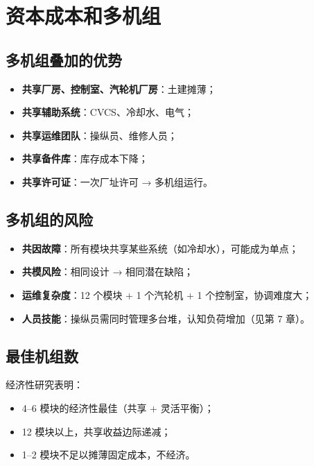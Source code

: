 \documentclass[
  UTF8,
  scheme=plain,
  fontsize=10pt,
  openany
]{ctexbook}
\begin{document}
\section{资本成本和多机组}\label{ux8d44ux672cux6210ux672cux548cux591aux673aux7ec4}

\subsection{多机组叠加的优势}\label{ux591aux673aux7ec4ux53e0ux52a0ux7684ux4f18ux52bf}

\begin{itemize}
\tightlist
\item
  \textbf{共享厂房、控制室、汽轮机厂房}：土建摊薄；
\item
  \textbf{共享辅助系统}：CVCS、冷却水、电气；
\item
  \textbf{共享运维团队}：操纵员、维修人员；
\item
  \textbf{共享备件库}：库存成本下降；
\item
  \textbf{共享许可证}：一次厂址许可 → 多机组运行。
\end{itemize}

\subsection{多机组的风险}\label{ux591aux673aux7ec4ux7684ux98ceux9669}

\begin{itemize}
\tightlist
\item
  \textbf{共因故障}：所有模块共享某些系统（如冷却水），可能成为单点；
\item
  \textbf{共模风险}：相同设计 → 相同潜在缺陷；
\item
  \textbf{运维复杂度}：12 个模块 + 1 个汽轮机 + 1 个控制室，协调难度大；
\item
  \textbf{人员技能}：操纵员需同时管理多台堆，认知负荷增加（见第 7 章）。
\end{itemize}

\subsection{最佳机组数}\label{ux6700ux4f73ux673aux7ec4ux6570}

经济性研究表明：

\begin{itemize}
\tightlist
\item
  4--6 模块的经济性最佳（共享 + 灵活平衡）；
\item
  12 模块以上，共享收益边际递减；
\item
  1--2 模块不足以摊薄固定成本，不经济。
\end{itemize}
\end{document}
